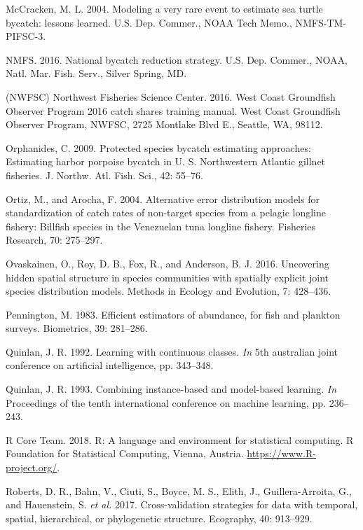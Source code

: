\documentclass[]{article}
\begin{document}
\hypertarget{ref-mccracken2004}{}
McCracken, M. L. 2004. Modeling a very rare event to estimate sea turtle
bycatch: lessons learned. U.S. Dep. Commer., NOAA Tech Memo.,
NMFS-TM-PIFSC-3.

\hypertarget{ref-nmfs2016bycatch}{}
NMFS. 2016. National bycatch reduction strategy. U.S. Dep. Commer.,
NOAA, Natl. Mar. Fish. Serv., Silver Spring, MD.

\hypertarget{ref-nwfsc2016}{}
(NWFSC) Northwest Fisheries Science Center. 2016. West Coast Groundfish
Observer Program 2016 catch shares training manual. West Coast
Groundfish Observer Program, NWFSC, 2725 Montlake Blvd E., Seattle, WA,
98112.

\hypertarget{ref-orphanides2009}{}
Orphanides, C. 2009. Protected species bycatch estimating approaches:
Estimating harbor porpoise bycatch in U. S. Northwestern Atlantic
gillnet fisheries. J. Northw. Atl. Fish. Sci., 42: 55--76.

\hypertarget{ref-ortiz2004}{}
Ortiz, M., and Arocha, F. 2004. Alternative error distribution models
for standardization of catch rates of non-target species from a pelagic
longline fishery: Billfish species in the Venezuelan tuna longline
fishery. Fisheries Research, 70: 275--297.

\hypertarget{ref-ovaskainen2016}{}
Ovaskainen, O., Roy, D. B., Fox, R., and Anderson, B. J. 2016.
Uncovering hidden spatial structure in species communities with
spatially explicit joint species distribution models. Methods in Ecology
and Evolution, 7: 428--436.

\hypertarget{ref-pennington1983}{}
Pennington, M. 1983. Efficient estimators of abundance, for fish and
plankton surveys. Biometrics, 39: 281--286.

\hypertarget{ref-quinlan1992}{}
Quinlan, J. R. 1992. Learning with continuous classes. \emph{In} 5th
australian joint conference on artificial intelligence, pp. 343--348.

\hypertarget{ref-quinlan1993}{}
Quinlan, J. R. 1993. Combining instance-based and model-based learning.
\emph{In} Proceedings of the tenth international conference on machine
learning, pp. 236--243.

\hypertarget{ref-rcoreteam2018}{}
R Core Team. 2018. R: A language and environment for statistical
computing. R Foundation for Statistical Computing, Vienna, Austria.
\url{https://www.R-project.org/}.

\hypertarget{ref-roberts2017}{}
Roberts, D. R., Bahn, V., Ciuti, S., Boyce, M. S., Elith, J.,
Guillera-Arroita, G., and Hauenstein, S. \emph{et al.} 2017.
Cross-validation strategies for data with temporal, spatial,
hierarchical, or phylogenetic structure. Ecography, 40: 913--929.
\end{document}
